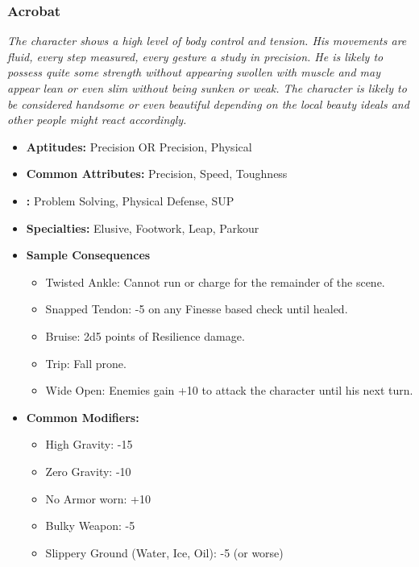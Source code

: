 	\subsubsection{Acrobat}\label{Acrobat}
		\textit{The character shows a high level of body control and tension. 
		His movements are fluid, every step measured, every gesture a study in precision.
		He is likely to possess quite some strength without appearing swollen with muscle and may appear lean or even slim without being sunken or weak.
		The character is likely to be considered handsome or even beautiful depending on the local beauty ideals and other people might react accordingly.}
		\begin{itemize}
			\item \textbf{Aptitudes:} Precision OR Precision, Physical
			\item \textbf{Common Attributes:} Precision, Speed, Toughness
			\item \textbf{:} Problem Solving, Physical Defense, SUP	
			\item \textbf{Specialties:} Elusive, Footwork, Leap, Parkour
			\item \textbf{Sample Consequences}
			\begin{itemize}
				\item Twisted Ankle: Cannot run or charge for the remainder of the scene.
				\item Snapped Tendon: -5 on any Finesse based check until healed.
				\item Bruise: 2d5 points of Resilience damage.
				\item Trip: Fall prone.
				\item Wide Open: Enemies gain +10 to attack the character until his next turn.
			\end{itemize}
			\item \textbf{Common Modifiers:}
			\begin{itemize}
				\item High Gravity: -15
				\item Zero Gravity: -10
				\item No Armor worn: +10
				\item Bulky Weapon: -5
				\item Slippery Ground (Water, Ice, Oil): -5 (or worse)
			\end{itemize}
		\end{itemize}

